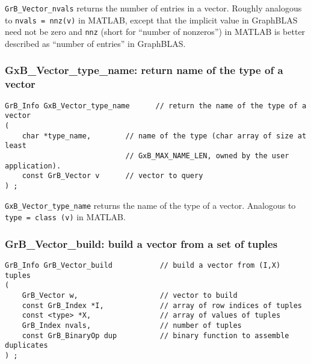 \documentclass[12pt]{article}
\begin{document}
\verb'GrB_Vector_nvals' returns the number of entries in a vector.  Roughly
analogous to \verb'nvals = nnz(v)' in MATLAB, except that the implicit value in
GraphBLAS need not be zero and \verb'nnz' (short for ``number of nonzeros'') in
MATLAB is better described as ``number of entries'' in GraphBLAS.

\subsubsection{{\sf GxB\_Vector\_type\_name:} return name of the type of a vector}
\label{vector_type_name}

\begin{mdframed}[userdefinedwidth=6in]
{\footnotesize
\begin{verbatim}
GrB_Info GxB_Vector_type_name      // return the name of the type of a vector
(
    char *type_name,        // name of the type (char array of size at least
                            // GxB_MAX_NAME_LEN, owned by the user application).
    const GrB_Vector v      // vector to query
) ;
\end{verbatim}
} \end{mdframed}

\verb'GxB_Vector_type_name' returns the name of the type of a vector.
Analogous to \verb'type = class (v)' in MATLAB.

\newpage
\subsubsection{{\sf GrB\_Vector\_build:}         build a vector from a set of tuples}
\label{vector_build}

\begin{mdframed}[userdefinedwidth=6in]
{\footnotesize
\begin{verbatim}
GrB_Info GrB_Vector_build           // build a vector from (I,X) tuples
(
    GrB_Vector w,                   // vector to build
    const GrB_Index *I,             // array of row indices of tuples
    const <type> *X,                // array of values of tuples
    GrB_Index nvals,                // number of tuples
    const GrB_BinaryOp dup          // binary function to assemble duplicates
) ;
\end{verbatim}
} \end{mdframed}
\end{document}

